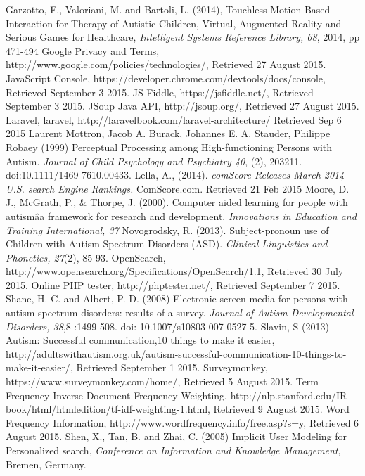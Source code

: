 \documentclass[a4paper, 11pt]{article}
\begin{document}
\begin{thebibliography}{100}
 Garzotto, F., Valoriani, M. and Bartoli, L. (2014), Touchless Motion-Based Interaction for Therapy of Autistic Children, Virtual, Augmented Reality and Serious Games for Healthcare, \textit{Intelligent Systems Reference Library, 68}, 2014, pp 471-494
 Google Privacy and Terms, http://www.google.com/policies/technologies/, Retrieved 27 August 2015.
 JavaScript Console, https://developer.chrome.com/devtools/docs/console, Retrieved September 3 2015.
 JS Fiddle, https://jsfiddle.net/, Retrieved September 3 2015.
 JSoup Java API, http://jsoup.org/, Retrieved 27 August 2015.
Laravel, laravel, http://laravelbook.com/laravel-architecture/ Retrieved Sep 6 2015
Laurent Mottron, Jacob A. Burack, Johannes E. A. Stauder, Philippe Robaey (1999) Perceptual Processing among High-functioning Persons with Autism. \textit{Journal of Child Psychology and Psychiatry 40}, (2), 203211. doi:10.1111/1469-7610.00433.
Lella, A., (2014). \textit{comScore Releases March 2014 U.S. search Engine Rankings.} ComScore.com. Retrieved 21 Feb 2015
Moore, D. J., McGrath, P., \& Thorpe, J. (2000). Computer aided learning for people with autismâa framework for research and development. \textit{Innovations in Education and Training International, 37}
 Novogrodsky, R. (2013). Subject-pronoun use of Children with Autism Spectrum Disorders (ASD). \textit{Clinical Linguistics and Phonetics, 27}(2), 85-93. 
OpenSearch, http://www.opensearch.org/Specifications/OpenSearch/1.1, Retrieved 30 July 2015.
 Online PHP tester, http://phptester.net/, Retrieved September 7 2015.
Shane, H. C. and Albert, P. D. (2008) Electronic screen media for persons with autism spectrum disorders: results of a survey. \textit{Journal of Autism Developmental Disorders, 38},8 :1499-508. doi: 10.1007/s10803-007-0527-5.
 Slavin, S (2013) Autism: Successful communication,10 things to make it easier, http://adultswithautism.org.uk/autism-successful-communication-10-things-to-make-it-easier/, Retrieved September 1 2015.
Surveymonkey, https://www.surveymonkey.com/home/, Retrieved 5 August 2015.
 Term Frequency Inverse Document Frequency Weighting, http://nlp.stanford.edu/IR-book/html/htmledition/tf-idf-weighting-1.html, Retrieved 9 August 2015.
 Word Frequency Information, http://www.wordfrequency.info/free.asp?s=y, Retrieved 6 August 2015.
Shen, X., Tan, B. and Zhai, C. (2005) Implicit User Modeling for Personalized search, \textit{Conference on Information and Knowledge Management}, Bremen, Germany.
\end{thebibliography}
\end{document}
